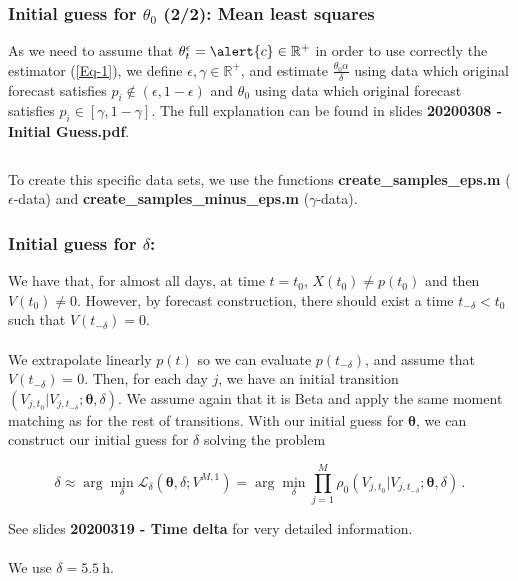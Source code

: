 \documentclass[aspectratio=169]{beamer}\usepackage[utf8]{inputenc}
\newcommand{\R}{\mathbb{R}}
\begin{document}
\begin{frame}\frametitle{Initial guess for $\theta_0$ (2/2): Mean least squares}

As we need to assume that $\theta_t^\epsilon=\alert{c}\in\R^+$ in order to use correctly the estimator (\ref{Eq-1}), we define $\epsilon,\gamma\in\R^+$, and estimate $\frac{\theta_0\alpha}{\delta}$ using data which original forecast satisfies $p_i\notin(\epsilon,1-\epsilon)$ and $\theta_0$ using data which original forecast satisfies $p_i\in[\gamma,1-\gamma]$. The full explanation can be found in slides \textbf{20200308 - Initial Guess.pdf}.

\begin{center}
\begin{tabular}{|c|}
\toprule
{\tiny

}\\
\bottomrule
\end{tabular}
\end{center}
To create this specific data sets, we use the functions \textbf{create\_samples\_eps.m} ($\epsilon$-data) and \textbf{create\_samples\_minus\_eps.m} ($\gamma$-data).

\end{frame}


\begin{frame}\frametitle{Initial guess for $\delta$:}

We have that, for almost all days, at time $t=t_0$, $X(t_0)\neq p(t_0)$ and then $V(t_0)\neq0$. However, by forecast construction, there should exist a time $t_{-\delta}<t_0$ such that $V(t_{-\delta})=0$.\\
\quad\\
We extrapolate linearly $p(t)$ so we can evaluate $p(t_{-\delta})$, and assume that $V(t_{-\delta})=0$. Then, for each day $j$, we have an initial transition $(V_{j, t_0}|V_{j, t_{-\delta}};\bm{\theta},\delta)$. We assume again that it is Beta and apply the same moment matching as for the rest of transitions. With our initial guess for $\bm{\theta}$, we can construct our initial guess for $\delta$ solving the problem

\begin{equation*}
\delta\approx\arg\min_{\delta}\mathcal{L}_{\delta}(\bm{\theta},\delta; V^{M,1}) = \arg\min_{\delta}\prod\limits_{j=1}^M \rho_0 (V_{j, t_0}|V_{j, t_{-\delta}};\bm{\theta},\delta) \,.
\label{likelihood_delta}
\end{equation*}

See slides \textbf{20200319 - Time delta} for very detailed information.\\
\quad\\
We use $\delta=\SI{5.5}{\hour}$.

\end{frame}
\end{document}
